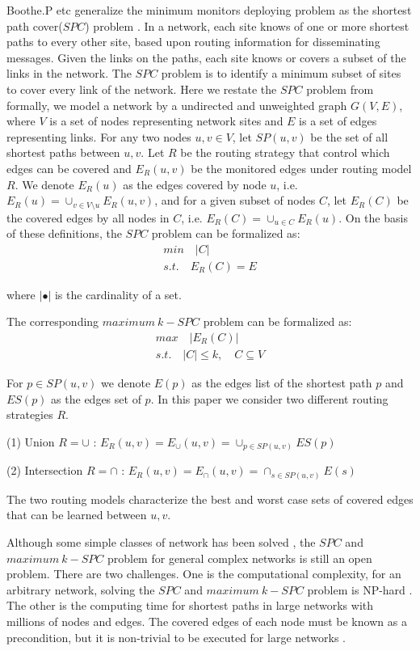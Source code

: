 \documentclass[review]{elsarticle}
\begin{document}
Boothe.P etc generalize the minimum monitors deploying problem as the shortest path cover($SPC$) problem \cite{boothe2007graph}. In a network, each site knows of one or more shortest paths to every other site, based upon routing information for disseminating messages. Given the links on the paths, each site knows or covers a subset of the links in the network. The $SPC$ problem is to identify a minimum subset of sites to cover every link of the network. Here we restate the $SPC$ problem from \cite{boothe2007graph,pignolet2017tomographic} formally,  we model a network by a undirected and unweighted graph $G(V,E)$, where $V$ is a set of nodes representing network sites and $E$ is a set of  edges representing links. For any two nodes $u,v \in V $, let $SP(u,v)$ be the set of all shortest paths between $u,v$. Let $R$ be the routing strategy that control which edges can be covered and $E_R(u,v)$ be the monitored edges under routing model $R$. We denote $E_R(u)$ as the edges covered by node $u$, i.e. $E_R(u)=\cup_{v \in V \setminus u}E_R(u,v)$, and for a given subset of nodes $C$, let $E_R(C)$ be the covered edges by all nodes in $C$,  i.e. $E_R(C)=\cup_{u \in C} E_R(u)$. On the basis of these definitions, the $SPC$ problem can be formalized as:
\begin{gather*}
min    \quad \lvert C \lvert \\
s.t.   \quad E_R(C)=E
\end{gather*}

where $\lvert \bullet \rvert$ is the cardinality of a set.

The corresponding $maximum \  k-SPC$ problem can be formalized as:
\begin{gather*}
max   \quad   \lvert E_R(C) \rvert \\
s.t.  \quad \lvert C \rvert \leq k, \quad C \subseteq V
\end{gather*}

For $p \in SP(u,v)$ we denote $E(p)$ as the edges list of the shortest path $p$ and $ES(p)$ as the edges set of $p$. In this paper we consider two different routing strategies $R$.

(1) Union $R=\cup$ : $E_R(u,v)=E_{\cup}(u,v)=\cup_{p \in SP(u,v)}ES(p)$

(2) Intersection $R=\cap$ :  $E_R(u,v)=E_{\cap}(u,v)=\cap_{s \in SP(u,v)}E(s)$

The two routing models characterize the best and worst case sets of covered edges that can be learned between $u,v$.

Although some simple classes of network has been solved \cite{boothe2007graph,pignolet2017tomographic}, the $SPC$ and $maximum \  k-SPC$ problem for general complex networks is still an open problem. There are two challenges. One is the computational complexity, for an arbitrary network, solving the $SPC$ and $maximum \  k-SPC$ problem is NP-hard \cite{boothe2007graph}. The other is the computing time for shortest paths in large networks with millions of nodes and edges. The covered edges of each node must be known as a precondition, but it is non-trivial to be executed for large networks \cite{gubichev2010fast,akiba2012shortest,madkour2017survey}.
\end{document}
